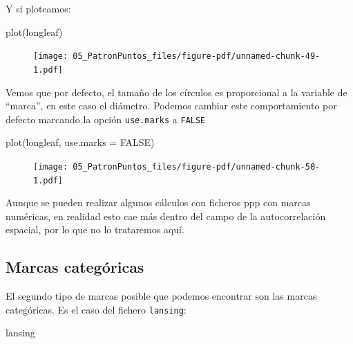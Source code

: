 \documentclass[
  letterpaper,
  DIV=11,
  numbers=noendperiod]{scrreprt}
\newenvironment{Shaded}{\begin{snugshade}}{\end{snugshade}}
\newcommand{\AttributeTok}[1]{\textcolor[rgb]{0.40,0.45,0.13}{#1}}
\newcommand{\ConstantTok}[1]{\textcolor[rgb]{0.56,0.35,0.01}{#1}}
\newcommand{\FunctionTok}[1]{\textcolor[rgb]{0.28,0.35,0.67}{#1}}
\newcommand{\NormalTok}[1]{\textcolor[rgb]{0.00,0.23,0.31}{#1}}
\begin{document}
Y si ploteamos:

\begin{Shaded}
\begin{Highlighting}[]
\FunctionTok{plot}\NormalTok{(longleaf)}
\end{Highlighting}
\end{Shaded}

\begin{figure}[H]

{\centering \texttt{[image: 05\_PatronPuntos\_files/figure-pdf/unnamed-chunk-49-1.pdf]}

}

\end{figure}

Vemos que por defecto, el tamaño de los círculos es proporcional a la
variable de ``marca'', en este caso el diámetro. Podemos cambiar este
comportamiento por defecto marcando la opción \texttt{use.marks} a
\texttt{FALSE}

\begin{Shaded}
\begin{Highlighting}[]
\FunctionTok{plot}\NormalTok{(longleaf, }\AttributeTok{use.marks =} \ConstantTok{FALSE}\NormalTok{)}
\end{Highlighting}
\end{Shaded}

\begin{figure}[H]

{\centering \texttt{[image: 05\_PatronPuntos\_files/figure-pdf/unnamed-chunk-50-1.pdf]}

}

\end{figure}

Aunque se pueden realizar algunos cálculos con ficheros ppp con marcas
numéricas, en realidad esto cae más dentro del campo de la
autocorrelación espacial, por lo que no lo trataremos aquí.

\hypertarget{marcas-categuxf3ricas}{%
\subsection{Marcas categóricas}\label{marcas-categuxf3ricas}}

El segundo tipo de marcas posible que podemos encontrar son las marcas
categóricas. Es el caso del fichero \texttt{lansing}:

\begin{Shaded}
\begin{Highlighting}[]
\NormalTok{lansing}
\end{Highlighting}
\end{Shaded}
\end{document}
